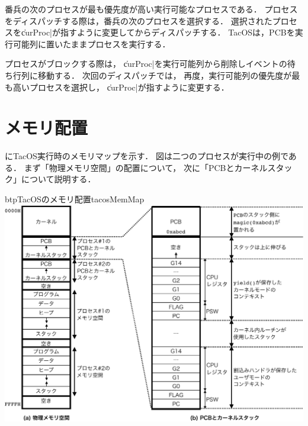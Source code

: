 番兵の次のプロセスが最も優先度が高い実行可能なプロセスである．
プロセスをディスパッチする際は，番兵の次のプロセスを選択する．
選択されたプロセスを\|curProc|が指すように変更してからディスパッチする．
TacOSは，PCBを実行可能列に置いたままプロセスを実行する．

プロセスがブロックする際は，
\|curProc|を実行可能列から削除しイベントの待ち行列に移動する．
次回のディスパッチでは，
再度，実行可能列の優先度が最も高いプロセスを選択し，
\|curProc|が指すように変更する．

\section{メモリ配置}
にTacOS実行時のメモリマップを示す．
図は二つのプロセスが実行中の例である．
まず「物理メモリ空間」の配置について，
次に「PCBとカーネルスタック」について説明する．

\begin{myfig}{btp}{TacOSのメモリ配置}{tacosMemMap}
  \includegraphics[scale=0.6]{Fig/tacosMemMap-crop.pdf}
\end{myfig}

